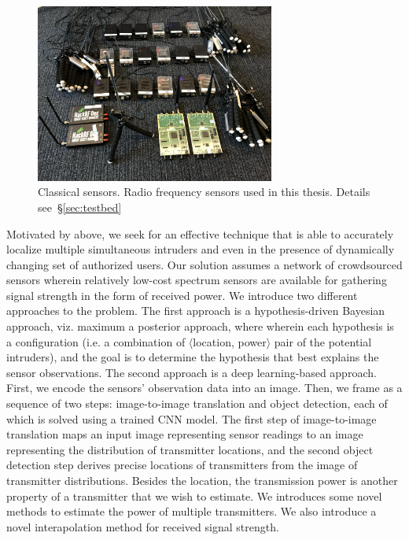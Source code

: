 \begin{figure}[t]
      \centering
      \includegraphics[width=0.7\textwidth]{figures/SDR.png}
      \caption{Classical sensors. Radio frequency sensors used in this thesis. Details see~\S\ref{sec:testbed}} 
      \label{fig:intro-sdr}
\end{figure}

Motivated by above, we seek for an effective technique that is able to accurately localize multiple simultaneous
intruders and even in the presence of dynamically changing set of authorized users.
Our solution assumes a network of crowdsourced sensors wherein relatively low-cost spectrum sensors are available
for gathering signal strength in the form of received power.
We introduce two different approaches to the \mtl problem.
The first approach is a hypothesis-driven Bayesian approach, viz. maximum a posterior approach, where wherein each hypothesis is a configuration
(i.e. a combination of $\langle$location, power$\rangle$ pair of the potential intruders), and the goal is to determine the hypothesis 
that best explains the sensor observations.
The second approach is a deep learning-based approach. First, we encode the sensors' observation data into an image.
Then, we frame \mtl as a sequence of two steps: image-to-image translation 
and object detection, each of which is solved using a trained CNN model. 
The first step of image-to-image translation maps an input image representing sensor readings to an image
representing the distribution of transmitter locations, and the second object detection step derives precise locations of
transmitters from the image of transmitter distributions. 
Besides the location, the transmission power is another property of a transmitter that we wish to estimate.
We introduces some novel methods to estimate the power of multiple transmitters.
We also introduce a novel interapolation method for received signal strength.



